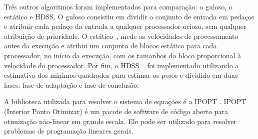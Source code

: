 Três outros algoritmos foram implementados para comparação: o guloso, o estático e 
HDSS. O guloso consistiu em dividir o conjunto de entrada em pedaços e atribuir 
cada pedaço da entrada a qualquer processador ocioso, sem qualquer atribuição de prioridade. O estático~\cite{raphael}, mede as velocidades de processamento antes da execução e  atribui um conjunto 
de blocos estático para cada processador, no início da execução, com os
tamanhos do bloco proporcional à velocidade do processador. Por fim, o HDSS ~\cite{HDSS}  
foi implementado utilizando a estimativa dos mínimos quadrados para estimar os pesos e 
dividido em duas fases: fase de adaptação e fase de conclusão. 

A biblioteca utilizada para resolver o sistema de equações é a IPOPT \cite{point}. IPOPT (Interior Ponto Otimizar) é um pacote de software de código aberto para otimização não-linear em grande escala. Ele pode ser utilizado para resolver problemas de programação lineares gerais.

